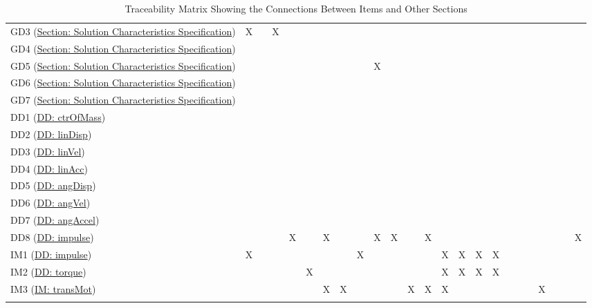 \documentclass[12pt]{article}
\begin{document}
\begin{longtable}{l l l l l l l l l l l l l l l l l l l l l l l l}
\\
GD3 (\hyperref[Sec:SolCharSpec]{Section: Solution Characteristics Specification}) & X &  & X &  &  &  &  &  &  &  &  &  &  &  &  &  &  &  &  &  &  &  & 
\\
GD4 (\hyperref[Sec:SolCharSpec]{Section: Solution Characteristics Specification}) &  &  &  &  &  &  &  &  &  &  &  &  &  &  &  &  &  &  &  &  &  &  & 
\\
GD5 (\hyperref[Sec:SolCharSpec]{Section: Solution Characteristics Specification}) &  &  &  &  &  &  &  &  & X &  &  &  &  &  &  &  &  &  &  &  &  &  & 
\\
GD6 (\hyperref[Sec:SolCharSpec]{Section: Solution Characteristics Specification}) &  &  &  &  &  &  &  &  &  &  &  &  &  &  &  &  &  &  &  &  &  &  & 
\\
GD7 (\hyperref[Sec:SolCharSpec]{Section: Solution Characteristics Specification}) &  &  &  &  &  &  &  &  &  &  &  &  &  &  &  &  &  &  &  &  &  &  & 
\\
DD1 (\hyperref[DD:ctrOfMass]{DD: ctrOfMass}) &  &  &  &  &  &  &  &  &  &  &  &  &  &  &  &  &  &  &  &  &  &  & 
\\
DD2 (\hyperref[DD:linDisp]{DD: linDisp}) &  &  &  &  &  &  &  &  &  &  &  &  &  &  &  &  &  &  &  &  &  &  & 
\\
DD3 (\hyperref[DD:linVel]{DD: linVel}) &  &  &  &  &  &  &  &  &  &  &  &  &  &  &  &  &  &  &  &  &  &  & 
\\
DD4 (\hyperref[DD:linAcc]{DD: linAcc}) &  &  &  &  &  &  &  &  &  &  &  &  &  &  &  &  &  &  &  &  &  &  & 
\\
DD5 (\hyperref[DD:angDisp]{DD: angDisp}) &  &  &  &  &  &  &  &  &  &  &  &  &  &  &  &  &  &  &  &  &  &  & 
\\
DD6 (\hyperref[DD:angVel]{DD: angVel}) &  &  &  &  &  &  &  &  &  &  &  &  &  &  &  &  &  &  &  &  &  &  & 
\\
DD7 (\hyperref[DD:angAccel]{DD: angAccel}) &  &  &  &  &  &  &  &  &  &  &  &  &  &  &  &  &  &  &  &  &  &  & 
\\
DD8 (\hyperref[DD:impulse]{DD: impulse}) &  &  &  & X &  & X &  &  & X & X &  & X &  &  &  &  &  &  &  &  &  &  & X
\\
IM1 (\hyperref[DD:impulse]{DD: impulse}) & X &  &  &  &  &  &  & X &  &  &  &  & X & X & X & X &  &  &  &  &  &  & 
\\
IM2 (\hyperref[DD:torque]{DD: torque}) &  &  &  &  & X &  &  &  &  &  &  &  & X & X & X & X &  &  &  &  &  &  & 
\\
IM3 (\hyperref[IM:transMot]{IM: transMot}) &  &  &  &  &  & X & X &  &  &  & X & X & X &  &  &  &  &  &  & X &  &  & 
\\
\bottomrule
\caption{Traceability Matrix Showing the Connections Between Items and Other Sections}
\label{Table:TraceyItemsSecs}
\end{longtable}
\end{document}
